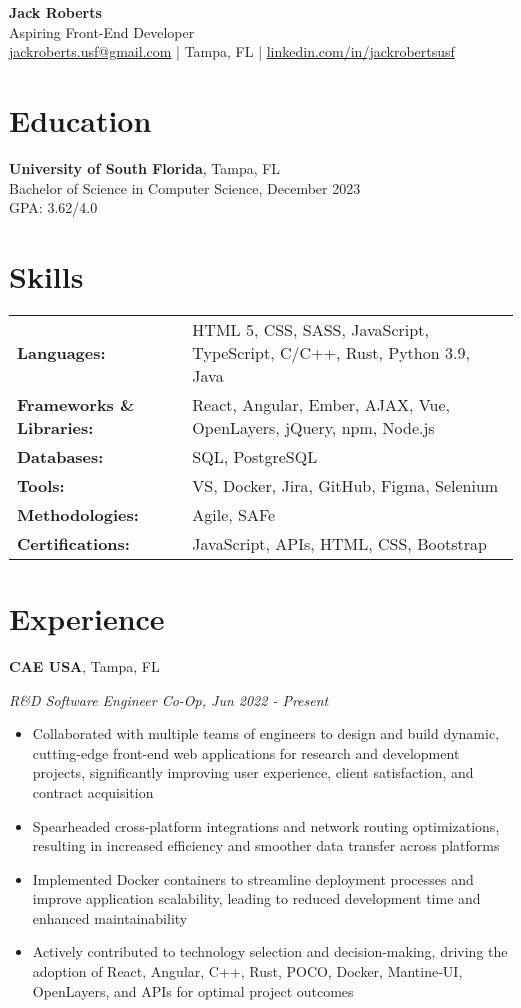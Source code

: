 \documentclass[a4paper,10pt]{article}
\begin{document}
\begin{center}
    \textbf{\LARGE Jack Roberts} \\
    Aspiring Front-End Developer \\
    \href{mailto:jackroberts.usf@gmail.com}{jackroberts.usf@gmail.com} | Tampa, FL | \href{https://linkedin.com/in/jackrobertsusf}{linkedin.com/in/jackrobertsusf}
\end{center}

\section*{Education}
\textbf{University of South Florida}, Tampa, FL \\
Bachelor of Science in Computer Science, December 2023 \\
GPA: 3.62/4.0

\section*{Skills}
\begin{tabular}{ll}
    \textbf{Languages:} & HTML 5, CSS, SASS, JavaScript, TypeScript, C/C++, Rust, Python 3.9, Java \\
    \textbf{Frameworks \& Libraries:} & React, Angular, Ember, AJAX, Vue, OpenLayers, jQuery, npm, Node.js \\
    \textbf{Databases:} & SQL, PostgreSQL \\
    \textbf{Tools:} & VS, Docker, Jira, GitHub, Figma, Selenium \\
    \textbf{Methodologies:} & Agile, SAFe \\
    \textbf{Certifications:} & JavaScript, APIs, HTML, CSS, Bootstrap \\
\end{tabular}

\section*{Experience}
\raggedright\textbf{CAE USA}, Tampa, FL \\
\raggedright\textit{R\&D Software Engineer Co-Op, Jun 2022 - Present}
\begin{itemize}
    \item Collaborated with multiple teams of engineers to design and build dynamic, cutting-edge front-end web applications for research and development projects, significantly improving user experience, client satisfaction, and contract acquisition
    \item Spearheaded cross-platform integrations and network routing optimizations, resulting in increased efficiency and smoother data transfer across platforms
    \item Implemented Docker containers to streamline deployment processes and improve application scalability, leading to reduced development time and enhanced maintainability
    \item Actively contributed to technology selection and decision-making, driving the adoption of React, Angular, C++, Rust, POCO, Docker, Mantine-UI, OpenLayers, and APIs for optimal project outcomes
\end{itemize}
\end{document}
